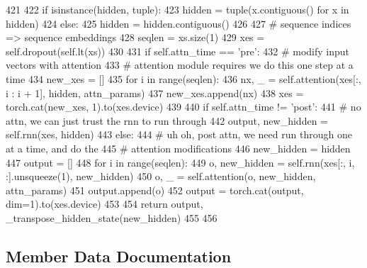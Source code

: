 \begin{DoxyCode}
421 
422         \textcolor{keywordflow}{if} isinstance(hidden, tuple):
423             hidden = tuple(x.contiguous() \textcolor{keywordflow}{for} x \textcolor{keywordflow}{in} hidden)
424         \textcolor{keywordflow}{else}:
425             hidden = hidden.contiguous()
426 
427         \textcolor{comment}{# sequence indices => sequence embeddings}
428         seqlen = xs.size(1)
429         xes = self.dropout(self.lt(xs))
430 
431         \textcolor{keywordflow}{if} self.attn\_time == \textcolor{stringliteral}{'pre'}:
432             \textcolor{comment}{# modify input vectors with attention}
433             \textcolor{comment}{# attention module requires we do this one step at a time}
434             new\_xes = []
435             \textcolor{keywordflow}{for} i \textcolor{keywordflow}{in} range(seqlen):
436                 nx, \_ = self.attention(xes[:, i : i + 1], hidden, attn\_params)
437                 new\_xes.append(nx)
438             xes = torch.cat(new\_xes, 1).to(xes.device)
439 
440         \textcolor{keywordflow}{if} self.attn\_time != \textcolor{stringliteral}{'post'}:
441             \textcolor{comment}{# no attn, we can just trust the rnn to run through}
442             output, new\_hidden = self.rnn(xes, hidden)
443         \textcolor{keywordflow}{else}:
444             \textcolor{comment}{# uh oh, post attn, we need run through one at a time, and do the}
445             \textcolor{comment}{# attention modifications}
446             new\_hidden = hidden
447             output = []
448             \textcolor{keywordflow}{for} i \textcolor{keywordflow}{in} range(seqlen):
449                 o, new\_hidden = self.rnn(xes[:, i, :].unsqueeze(1), new\_hidden)
450                 o, \_ = self.attention(o, new\_hidden, attn\_params)
451                 output.append(o)
452             output = torch.cat(output, dim=1).to(xes.device)
453 
454         \textcolor{keywordflow}{return} output, \_transpose\_hidden\_state(new\_hidden)
455 
456 
\end{DoxyCode}


\subsection{Member Data Documentation}
\mbox{\label{classparlai_1_1agents_1_1seq2seq_1_1modules_1_1RNNDecoder_a28ca5ae00c8d57bb952a8c4f477da2db}} 
